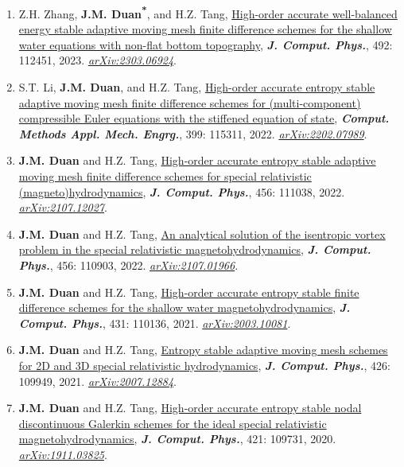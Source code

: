 %
\setcounter{enum}{1}
\begin{enumerate}
%
\item[\circenum] Z.H. Zhang, {\bfseries J.M. Duan\textsuperscript{*}}, and H.Z. Tang, \href{https://doi.org/10.1016/j.jcp.2023.112451}{High-order accurate well-balanced energy stable adaptive moving mesh finite difference schemes for the shallow water equations with non-flat bottom topography}, {\em\bfseries J. Comput. Phys.}, 492: 112451, 2023. \href{https://arxiv.org/abs/2303.06924}{\em arXiv:2303.06924}.
%
\item[\circenum] S.T. Li, {\bfseries J.M. Duan}, and H.Z. Tang, \href{https://doi.org/10.1016/j.cma.2022.115311}{High-order accurate entropy stable adaptive moving mesh finite difference schemes for (multi-component) compressible Euler equations with the stiffened equation of state}, {\em\bfseries Comput. Methods Appl. Mech. Engrg.}, 399: 115311, 2022. \href{https://arxiv.org/abs/2202.07989}{\em arXiv:2202.07989}.
%
\item[\circenum] {\bfseries J.M. Duan} and H.Z. Tang, \href{https://doi.org/10.1016/j.jcp.2022.111038}{High-order accurate entropy stable adaptive moving mesh finite difference schemes for special relativistic (magneto)hydrodynamics}, {\em\bfseries J. Comput. Phys.}, 456: 111038, 2022. \href{https://arxiv.org/abs/2107.12027}{\em arXiv:2107.12027}.
%
\item[\circenum] {\bfseries J.M. Duan} and H.Z. Tang, \href{https://doi.org/10.1016/j.jcp.2021.110903}{An analytical solution of the isentropic vortex problem in the special relativistic magnetohydrodynamics}, {\em\bfseries J. Comput. Phys.}, 456: 110903, 2022. \href{https://arxiv.org/abs/2107.01966}{\em arXiv:2107.01966}.
%
\item[\circenum] {\bfseries J.M. Duan} and H.Z. Tang, \href{https://doi.org/10.1016/j.jcp.2021.110136}{High-order accurate entropy stable finite difference schemes for the shallow water magnetohydrodynamics}, {\em\bfseries J. Comput. Phys.}, 431: 110136, 2021. \href{https://arxiv.org/abs/2003.10081}{\em arXiv:2003.10081}.
%
\item[\circenum] {\bfseries J.M. Duan} and H.Z. Tang, \href{https://doi.org/10.1016/j.jcp.2020.109949}{Entropy stable adaptive moving mesh schemes for 2D and 3D special relativistic hydrodynamics}, {\em\bfseries J. Comput. Phys.}, 426: 109949, 2021. \href{https://arxiv.org/abs/2007.12884}{\em arXiv:2007.12884}.
%
\item[\circenum] {\bfseries J.M. Duan} and H.Z. Tang, \href{https://doi.org/10.1016/j.jcp.2020.109731}{High-order accurate entropy stable nodal discontinuous Galerkin schemes for the ideal special relativistic magnetohydrodynamics}, {\em\bfseries J. Comput. Phys.}, 421: 109731, 2020. \href{https://arxiv.org/abs/1911.03825}{\em arXiv:1911.03825}.

\end{enumerate}
